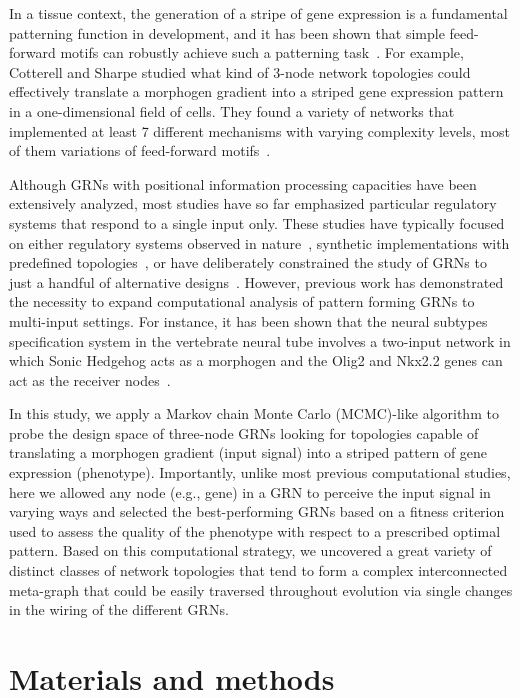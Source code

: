 \documentclass[10pt,letterpaper]{article}
\begin{document}
In a tissue context, the generation of a stripe of gene expression is a fundamental
patterning function in development, and it has been shown that simple feed-forward
motifs can robustly achieve such a patterning task~\cite{munteanu_2014}. For
example, Cotterell and Sharpe studied what kind of 3-node network topologies
could effectively translate a morphogen gradient into a striped gene expression
pattern in a one-dimensional field of cells. They found a variety of networks that
implemented at least 7 different mechanisms with varying complexity levels,
most of them variations of feed-forward motifs~\cite{Cotterell2010}.

Although GRNs with positional information processing capacities have been
extensively analyzed, most studies have so far emphasized particular
regulatory systems that respond to a single input only. These studies have
typically focused on either regulatory systems observed in
nature~\cite{vonDassow2000,Reinitz1995,Jaeger2004}, synthetic
implementations with predefined topologies~\cite{Basu2005, Schaerli2018,
Elowitz2000, barbier2020}, or have deliberately constrained the study of GRNs to just
a handful of alternative designs~\cite{munteanu_2014,Schaerli2014}. However,
previous work has demonstrated the necessity to expand computational analysis
of pattern forming GRNs to multi-input settings. For instance, it has been shown
that the neural subtypes specification system in the vertebrate neural tube involves
a  two-input network in which Sonic Hedgehog acts as a morphogen and the Olig2
and Nkx2.2 genes can act as the receiver nodes~\cite{dessaud_dynamic_2010,
balaskas2012, exelby_2021}.

In this study, we apply a Markov chain Monte Carlo (MCMC)-like algorithm to
probe the design space of three-node GRNs looking for topologies capable of
translating a morphogen gradient  (input signal) into a striped pattern of gene
expression (phenotype). Importantly, unlike most previous computational
studies, here we allowed any node (e.g., gene) in a GRN to perceive the input
signal in varying ways and selected the best-performing GRNs based on a
fitness criterion used to assess the quality of the phenotype with respect to
a prescribed optimal pattern. Based on this computational strategy, we uncovered
a great variety of distinct classes of network topologies that
tend to form a complex interconnected meta-graph that could be easily
traversed throughout evolution via single changes in the wiring of the
different GRNs.

\section*{Materials and methods}
\end{document}
